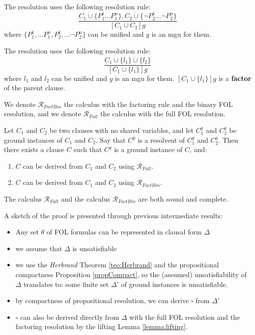 \documentclass[10pt, letterpaper]{report}
\begin{document}
\begin{definition}
    The resolution uses the following resolution rule:
    \begin{equation}
        \frac{C_1\dot\cup\{P_1^1\dots P_1^n\},C_2\dot\cup\{\lnot P_2^1\dots \lnot P_2^n\}}{[C_1\cup C_2]g}
    \end{equation}
    where $\{P_1^1,\dots P_1^n,P_2^1,\dots \lnot P_2^n\}$ can be unified and  $g$ is an mgu for them.
\end{definition}
\begin{definition}[Factoring]
    The resolution uses the following resolution rule:\begin{equation}
        \frac{C_1\dot\cup\{l_1\}\dot\cup\{l_2\}}{
            [C_1\cup\{l_1\}]g
        }
    \end{equation}
    where $l_1$ and $l_2$ can be unified and $g$ is an mgu for them. $[C_1\cup\{l_1\}]g$ is a \textbf{factor} of the parent clause.
\end{definition}
We denote $\mathcal{R}_{FactBin}$ the calculus with the factoring rule and the binary FOL resolution, and we denote $\mathcal{R}_{Full}$ the calculus with the full FOL resolution.
\begin{lemma2}\label{lemma:lifting}
    Let $C_1$ and $C_2$ be two clauses with no shared variables, and let $C_1^g$ and $C_2^g$ be ground instances of $C_1$ and $C_2$. Say that $C^g$ is a resolvent of $C_1^g$ and $C_2^g$. Then there exists a clause $C$ such that $C^g$ is a ground instance of $C$, and:
\begin{enumerate}
    \item$C$ can be derived from $C_1$ and $C_2$ using $\mathcal{R}_{Full}$.
    \item$C$ can be derived from $C_1$ and $C_2$ using $\mathcal{R}_{FactBin}$.
\end{enumerate}
\end{lemma2}
\begin{theorem}
    The calculus $\mathcal{R}_{Full}$ and the calculus $\mathcal{R}_{FactBin}$ are both sound and complete.
\end{theorem}
A sketch of the proof is presented through previous intermediate results:\begin{itemize}
    \item Any set $\theta$ of FOL formulas can be represented in clausal form $\Delta$
    \item we assume that $\Delta$ is unsatisfiable 
    \item we use the \textit{Herbrand} Theorem \ref{teo:Herbrand} and the propositional compactness Proposition \ref{propCompact}, so the (assumed) unsatisfiability of $\Delta$ translates to: some finite set $\Delta'$ of ground instances is unsatisfiable.
    \item by compactness of propositional resolution, we can derive $\square$ from $\Delta'$
    \item $\square$ can also be derived directly from $\Delta$ with the full FOL resolution and the factoring resolution by the lifting Lemma \ref{lemma:lifting}.
\end{itemize} 
\end{document}
